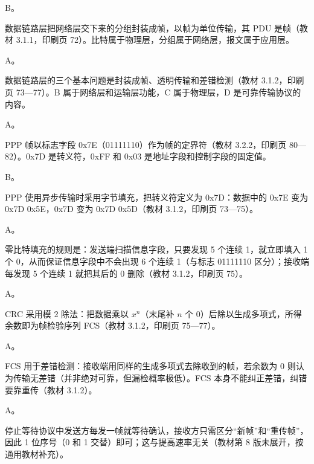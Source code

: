 \documentclass[a4paper,11pt]{article}
\begin{document}


\q B。\begin{analysis}数据链路层把网络层交下来的分组封装成帧，以帧为单位传输，其 PDU 是帧（教材 3.1.1，印刷页 72）。比特属于物理层，分组属于网络层，报文属于应用层。\end{analysis}

\q A。\begin{analysis}数据链路层的三个基本问题是封装成帧、透明传输和差错检测（教材 3.1.2，印刷页 73—77）。B 属于网络层和运输层功能，C 属于物理层，D 是可靠传输协议的内容。\end{analysis}

\q A。\begin{analysis}PPP 帧以标志字段 0x7E（01111110）作为帧的定界符（教材 3.2.2，印刷页 80—82）。0x7D 是转义符，0xFF 和 0x03 是地址字段和控制字段的固定值。\end{analysis}

\q B。\begin{analysis}PPP 使用异步传输时采用字节填充，把转义符定义为 0x7D：数据中的 0x7E 变为 0x7D 0x5E，0x7D 变为 0x7D 0x5D（教材 3.1.2，印刷页 73—75）。\end{analysis}

\q A。\begin{analysis}零比特填充的规则是：发送端扫描信息字段，只要发现 5 个连续 1，就立即填入 1 个 0，从而保证信息字段中不会出现 6 个连续 1（与标志 01111110 区分）；接收端每发现 5 个连续 1 就把其后的 0 删除（教材 3.1.2，印刷页 75）。\end{analysis}

\q A。\begin{analysis}CRC 采用模 2 除法：把数据乘以 $x^n$（末尾补 $n$ 个 0）后除以生成多项式，所得余数即为帧检验序列 FCS（教材 3.1.2，印刷页 75—77）。\end{analysis}

\q A。\begin{analysis}FCS 用于差错检测：接收端用同样的生成多项式去除收到的帧，若余数为 0 则认为传输无差错（并非绝对可靠，但漏检概率极低）。FCS 本身不能纠正差错，纠错要靠重传（教材 3.1.2）。\end{analysis}

\q A。\begin{analysis}停止等待协议中发送方每发一帧就等待确认，接收方只需区分“新帧”和“重传帧”，因此 1 位序号（0 和 1 交替）即可；这与提高速率无关（教材第 8 版未展开，按通用教材补充）。\end{analysis}
\end{document}
